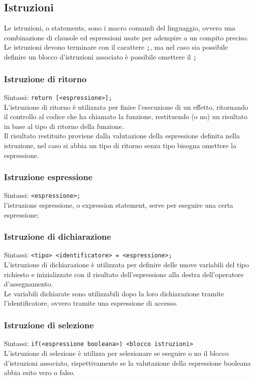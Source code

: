 \newpage
\subsection{Istruzioni}
Le istruzioni, o statements, sono i macro comandi del linguaggio, ovvero una combinazione 
di clausole ed espressioni usate per adempire a un compito preciso.
Le istruzioni devono terminare con il carattere \lstinline|;|, ma nel caso sia possibile definire
un blocco d'istruzioni associato è possibile omettere il \lstinline|;|

\subsubsection{Istruzione di ritorno}
Sintassi:   \lstinline|return [<espressione>];| \\
L’istruzione di ritorno è utilizzata per finire l’esecuzione di un effetto,
ritornando il controllo al codice che ha chiamato la funzione,
restituendo (o no) un risultato in base al tipo di ritorno della funzione. \\
Il risultato restituito proviene dalla valutazione della espressione definita nella istruzione,
nel caso si abbia un tipo di ritorno senza tipo bisogna omettere la espressione.

\subsubsection{Istruzione espressione}
Sintassi: \lstinline|<espressione>;| \\
l'istruzione espressione, o expression statement, serve per eseguire una certa espressione; 


\subsubsection{Istruzione di dichiarazione}
Sintassi: \lstinline|<tipo> <identificatore> = <espressione>;| \\
L'istruzione di dichiarazione è utilizzata per definire delle nuove variabili del tipo 
richiesto e inizializzate con il risultato dell'espressione alla destra dell'operatore d'assegnamento. \\
Le variabili dichiarate sono utilizzabili dopo la loro dichiarazione tramite l'identificatore, ovvero
tramite una espressione di accesso. 

\subsubsection{Istruzione di selezione}
Sintassi: \lstinline|if(<espressione booleana>) <blocco istruzioni>| \\
L'istruzione di selezione è utilizza per selezionare se eseguire o no il blocco d'istruzioni
associato, rispettivamente se la valutazione della espressione booleana abbia esito vero o falso.

